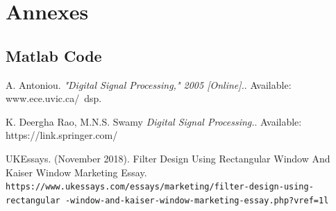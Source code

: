 \documentclass[twoside,12pt,times,onecolumn,a4paper]{report}
\begin{document}
\medskip




\appendix
\chapter{Annexes}
\section{Matlab Code}
%

\begin{thebibliography}{9}
A. Antoniou. 
\textit{"Digital Signal Processing," 2005 [Online].}. 
Available: www.ece.uvic.ca/~dsp.

K. Deergha Rao, M.N.S. Swamy
\textit{Digital Signal Processing.}. 
Available: https://link.springer.com/

UKEssays. (November 2018). Filter Design Using Rectangular Window And Kaiser Window Marketing Essay. 
\\\texttt{https://www.ukessays.com/essays/marketing/filter-design-using-rectangular
-window-and-kaiser-window-marketing-essay.php?vref=1l}
\end{thebibliography}
\end{document}
